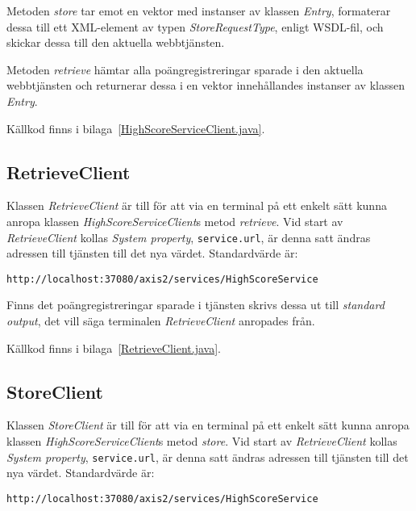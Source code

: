 \documentclass[a4paper, 12pt]{article}
\begin{document}
Metoden \textit{store} tar emot en vektor med instanser av klassen
\textit{Entry}, formaterar dessa till ett XML-element av typen
\textit{StoreRequestType}, enligt WSDL-fil, och skickar dessa till den
aktuella webbtjänsten.

Metoden \textit{retrieve} hämtar alla poäng\-registreringar sparade i
den aktuella webbtjänsten och returnerar dessa i en vektor
innehållandes instanser av klassen \textit{Entry}.

Källkod finns i bilaga~\ref{HighScoreServiceClient.java}.

\subsection{RetrieveClient}
Klassen \textit{RetrieveClient} är till för att via en terminal på ett
enkelt sätt kunna anropa klassen \textit{HighScoreServiceClient}s
metod \textit{retrieve}. Vid start av \textit{RetrieveClient} kollas
\textit{System property}, \verb!service.url!, är denna satt ändras
adressen till tjänsten till det nya värdet. Standardvärde är:

\begin{footnotesize}
\begin{verbatim}
http://localhost:37080/axis2/services/HighScoreService
\end{verbatim}
\end{footnotesize}

Finns det poäng\-registreringar sparade i tjänsten skrivs dessa ut till
\textit{standard output}, det vill säga terminalen
\textit{RetrieveClient} anropades från.

Källkod finns i bilaga~\ref{RetrieveClient.java}.

\subsection{StoreClient}
Klassen \textit{StoreClient} är till för att via en terminal på ett
enkelt sätt kunna anropa klassen \textit{HighScoreServiceClient}s
metod \textit{store}. Vid start av \textit{RetrieveClient} kollas
\textit{System property}, \verb!service.url!, är denna satt ändras
adressen till tjänsten till det nya värdet. Standardvärde är:

\begin{footnotesize}
\begin{verbatim}
http://localhost:37080/axis2/services/HighScoreService
\end{verbatim}
\end{footnotesize}
\end{document}
